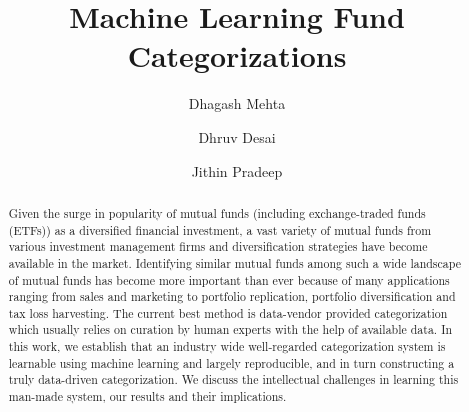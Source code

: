 \documentclass[sigconf]{acmart}
\begin{document}
\title{Machine Learning Fund Categorizations}


\author{Dhagash Mehta}

\author{Dhruv Desai}

\author{Jithin Pradeep}

\renewcommand{\shortauthors}{Mehta et al.}

\begin{abstract}
  Given the surge in popularity of mutual funds (including exchange-traded funds (ETFs)) as a diversified financial investment, a vast variety of mutual funds from various investment management firms and diversification strategies have become available in the market. Identifying similar mutual funds among such a wide landscape of mutual funds has become more important than ever because of many applications ranging from sales and marketing to portfolio replication, portfolio diversification and tax loss harvesting. The current best method is data-vendor provided categorization which usually relies on curation by human experts with the help of available data. In this work, we establish that an industry wide well-regarded categorization system is learnable using machine learning and largely reproducible, and in turn constructing a truly data-driven categorization. We discuss the intellectual challenges in learning this man-made system, our results and their implications. 
\end{abstract}
\end{document}

